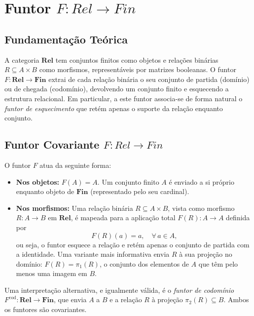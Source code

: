 \section{Funtor \texorpdfstring{$F: Rel \to Fin$}{F: Rel -> Fin}}
\label{sec:functor-rel-fin}

\subsection{Fundamentação Teórica}

A categoria $\mathbf{Rel}$ tem conjuntos finitos como objetos e relações binárias $R \subseteq A \times B$ como morfismos, representáveis por matrizes booleanas. O funtor $F: \mathbf{Rel} \to \mathbf{Fin}$ extrai de cada relação binária o seu conjunto de partida (domínio) ou de chegada (codomínio), devolvendo um conjunto finito e esquecendo a estrutura relacional. Em particular, a este funtor associa-se de forma natural o \emph{funtor de esquecimento} que retém apenas o suporte da relação enquanto conjunto.

\subsection{Funtor Covariante \texorpdfstring{$F: Rel \to Fin$}{F: Rel -> Fin}}

\begin{definition}
O funtor $F$ atua da seguinte forma:
\begin{itemize}
    \item \textbf{Nos objetos:} $F(A) = A$. Um conjunto finito $A$ é enviado a si próprio enquanto objeto de $\mathbf{Fin}$ (representado pelo seu cardinal).
    \item \textbf{Nos morfismos:} Uma relação binária $R \subseteq A \times B$, vista como morfismo $R: A \to B$ em $\mathbf{Rel}$, é mapeada para a aplicação total $F(R): A \to A$ definida por
    \[
        F(R)(a) = a, \quad \forall\, a \in A,
    \]
    ou seja, o funtor esquece a relação e retém apenas o conjunto de partida com a identidade. Uma variante mais informativa envia $R$ à sua projeção no domínio: $F(R) = \pi_1(R)$, o conjunto dos elementos de $A$ que têm pelo menos uma imagem em $B$.
\end{itemize}
\end{definition}

\begin{remark}
Uma interpretação alternativa, e igualmente válida, é o \emph{funtor de codomínio} $F^{\mathrm{cod}}: \mathbf{Rel} \to \mathbf{Fin}$, que envia $A$ a $B$ e a relação $R$ à projeção $\pi_2(R) \subseteq B$. Ambos os funtores são covariantes.
\end{remark}

